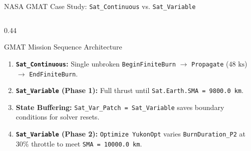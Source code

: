 \documentclass[aspectratio=169, 10pt]{beamer}
\begin{document}
\begin{frame}{NASA GMAT Case Study: \texttt{Sat\_Continuous} vs. \texttt{Sat\_Variable}}
\begin{columns}[T]
        \begin{column}{0.44\textwidth}
            \begin{exampleblock}{GMAT Mission Sequence Architecture}
                \scriptsize
                \begin{enumerate}\setlength{\itemsep}{2pt}\setlength{\topsep}{0pt}
                    \item \textbf{\texttt{Sat\_Continuous}:} Single unbroken \texttt{BeginFiniteBurn} $\to$ \texttt{Propagate} ($48\text{ ks}$) $\to$ \texttt{EndFiniteBurn}.
                    \item \textbf{\texttt{Sat\_Variable} (Phase 1):} Full thrust until \texttt{Sat.Earth.SMA = 9800.0 km}.
                    \item \textbf{State Buffering:} \texttt{Sat\_Var\_Patch = Sat\_Variable} saves boundary conditions for solver resets.
                    \item \textbf{\texttt{Sat\_Variable} (Phase 2):} \texttt{Optimize YukonOpt} varies \texttt{BurnDuration\_P2} at $30\%$ throttle to meet \texttt{SMA = 10000.0 km}.
                \end{enumerate}
            \end{exampleblock}
        \end{column}
    \end{columns}
\end{frame}
\end{document}

